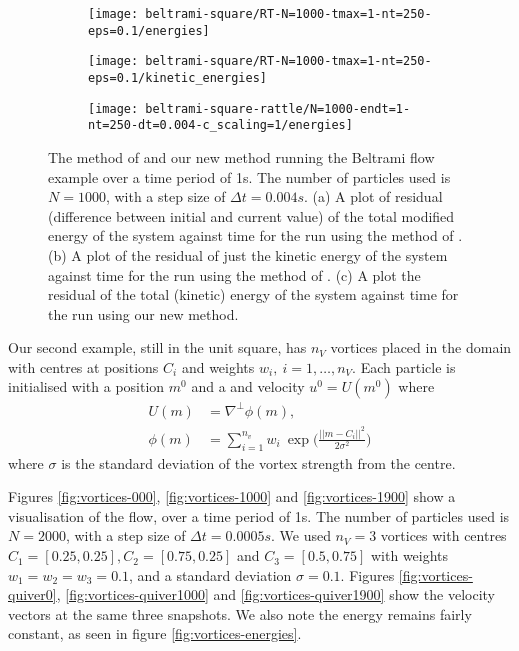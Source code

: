 \documentclass[11pt, oneside]{article}   	%
\newcommand{\dt}{\Delta t}
\begin{document}
\begin{figure}[H]
   \begin{subfigure}[t]{0.4\textwidth}
        \centering
	\texttt{[image: beltrami-square/RT-N=1000-tmax=1-nt=250-eps=0.1/energies]}
        \caption{} \label{fig:beltrami-flow-energies-q}
    \end{subfigure}
    \begin{subfigure}[t]{0.4\textwidth}
        \centering
	\texttt{[image: beltrami-square/RT-N=1000-tmax=1-nt=250-eps=0.1/kinetic\_energies]}
        \caption{} \label{fig:beltrami-flow-energies-q-ke}
    \end{subfigure}
   \begin{subfigure}[t]{0.4\textwidth}
        \centering
	\texttt{[image: beltrami-square-rattle/N=1000-endt=1-nt=250-dt=0.004-c\_scaling=1/energies]}
        \caption{} \label{fig:beltrami-flow-energies}
    \end{subfigure}
\centering
\caption{The method of \cite{gallouet2016lagrangian} and our new method running the Beltrami flow example over a time period of 1s. The number of particles used is \(N = 1000\), with a step size of \(\dt = 0.004s\). (a) A plot of residual (difference between initial and current value) of the total modified energy of the system against time for the run using the method of \cite{gallouet2016lagrangian}. (b) A plot of the residual of just the kinetic energy of the system against time for the run using the method of \cite{gallouet2016lagrangian}. (c) A plot the residual of the total (kinetic) energy of the system against time for the run using our new method.}
\centering
\label{fig:beltrami-flow-energy}
\end{figure}
 
Our second example, still in the unit square, has \(n_V\) vortices placed in the domain with centres at positions \(C_i\) and weights \(w_i, \: i = 1,\dots,n_V\). Each particle is initialised with a position \(m^0\) and a and velocity \(u^0 = U(m^0)\) where
\begin{align}
U(m) &= \nabla^\perp \phi(m), \\
\phi(m) &= \sum_{i=1}^{n_v} w_i \: \exp \Big( \frac{|| m - C_i ||^2}{2 \sigma^2} \Big)
\end{align}
where \(\sigma\) is the standard deviation of the vortex strength from the centre.

Figures \ref{fig:vortices-000}, \ref{fig:vortices-1000} and \ref{fig:vortices-1900} show a visualisation of the flow, over a time period of 1s. The number of particles used is \(N = 2000\), with a step size of \(\dt = 0.0005s\). We used \(n_V = 3\) vortices with centres \(C_1 = [0.25, 0.25], C_2 = [0.75, 0.25] \) and \(C_3 = [0.5, 0.75]\) with weights \(w_1 = w_2 = w_3 = 0.1\), and a standard deviation \(\sigma = 0.1\). Figures \ref{fig:vortices-quiver0}, \ref{fig:vortices-quiver1000} and \ref{fig:vortices-quiver1900}  show the velocity vectors at the same three snapshots. We also note the energy remains fairly constant, as seen in figure \ref{fig:vortices-energies}.
\end{document}
